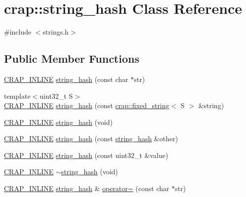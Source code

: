 \hypertarget{classcrap_1_1string__hash}{\section{crap\+:\+:string\+\_\+hash Class Reference}
\label{classcrap_1_1string__hash}
}


{\ttfamily \#include $<$strings.\+h$>$}

\subsection*{Public Member Functions}
\begin{DoxyCompactItemize}
\item 
\hyperlink{config__x86_8h_a5a40526b8d842e7ff731509998bb0f1c}{C\+R\+A\+P\+\_\+\+I\+N\+L\+I\+N\+E} \hyperlink{classcrap_1_1string__hash_aef520a81411b96aa0a40c11fb1682459}{string\+\_\+hash} (const char $\ast$str)
\item 
{\footnotesize template$<$uint32\+\_\+t S$>$ }\\\hyperlink{config__x86_8h_a5a40526b8d842e7ff731509998bb0f1c}{C\+R\+A\+P\+\_\+\+I\+N\+L\+I\+N\+E} \hyperlink{classcrap_1_1string__hash_a2a2372e34d1454787515dd8c1cec0363}{string\+\_\+hash} (const \hyperlink{classcrap_1_1fixed__string}{crap\+::fixed\+\_\+string}$<$ S $>$ \&string)
\item 
\hyperlink{config__x86_8h_a5a40526b8d842e7ff731509998bb0f1c}{C\+R\+A\+P\+\_\+\+I\+N\+L\+I\+N\+E} \hyperlink{classcrap_1_1string__hash_a8d6033864011aefc4d52032cde3a30dc}{string\+\_\+hash} (void)
\item 
\hyperlink{config__x86_8h_a5a40526b8d842e7ff731509998bb0f1c}{C\+R\+A\+P\+\_\+\+I\+N\+L\+I\+N\+E} \hyperlink{classcrap_1_1string__hash_a1cfb212e35e3ac5848bf86635afb962c}{string\+\_\+hash} (const \hyperlink{classcrap_1_1string__hash}{string\+\_\+hash} \&other)
\item 
\hyperlink{config__x86_8h_a5a40526b8d842e7ff731509998bb0f1c}{C\+R\+A\+P\+\_\+\+I\+N\+L\+I\+N\+E} \hyperlink{classcrap_1_1string__hash_a66d62eda5f4c5a1115cd4f82ccd8507a}{string\+\_\+hash} (const uint32\+\_\+t \&value)
\item 
\hyperlink{config__x86_8h_a5a40526b8d842e7ff731509998bb0f1c}{C\+R\+A\+P\+\_\+\+I\+N\+L\+I\+N\+E} \hyperlink{classcrap_1_1string__hash_aa7190b01ffa4d9e8cdb88c4f396f014d}{$\sim$string\+\_\+hash} (void)
\item 
\hyperlink{config__x86_8h_a5a40526b8d842e7ff731509998bb0f1c}{C\+R\+A\+P\+\_\+\+I\+N\+L\+I\+N\+E} \hyperlink{classcrap_1_1string__hash}{string\+\_\+hash} \& \hyperlink{classcrap_1_1string__hash_a6c707eb4e241e03bfdf48641c565bfb7}{operator=} (const char $\ast$str)

\end{DoxyCompactItemize}
